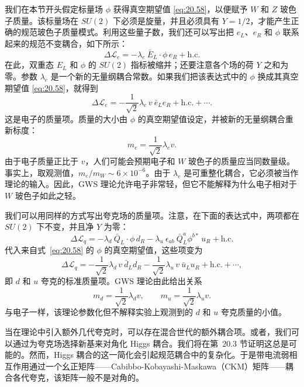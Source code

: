 我们在本节开头假定标量场 $\phi$ 获得真空期望值 \eqref{eq:20.58}，以便赋予 $W$ 和 $Z$ 玻色子质量。该标量场在 $SU(2)$ 下必须是旋量，并且必须具有 $Y = 1/2$，才能产生正确的规范玻色子质量模式。利用这些量子数，我们还可以写出把 $e_L$、$e_R$ 和 $\phi$ 联系起来的规范不变耦合，如下所示：
\begin{equation}
  \Delta\mathcal{L}_e = -\lambda_e\ \bar{E}_L\cdot\phi\,e_R + \mathrm{h.c.}
  \label{eq:20.98}
\end{equation}
在此，双重态 $E_L$ 和 $\phi$ 的 $SU(2)$ 指标被缩并；还要注意各个场的荷 $Y$ 之和为零。参数 $\lambda_e$ 是一个新的无量纲耦合常数。如果我们把该表达式中的 $\phi$ 换成其真空期望值 \eqref{eq:20.58}，就得到
\begin{equation}
  \Delta\mathcal{L}_e = -\frac{1}{\sqrt{2}}\lambda_e\,v\ \bar{e}_Le_R
    + \mathrm{h.c.} + \cdots .
  \label{eq:20.99}
\end{equation}
这是电子的质量项。质量的大小由 $\phi$ 的真空期望值设定，并被新的无量纲耦合重新标度：
\begin{equation}
  m_e = \frac{1}{\sqrt{2}}\lambda_e v .
  \label{eq:20.100}
\end{equation}
由于电子质量正比于 $v$，人们可能会预期电子和 $W$ 玻色子的质量应当同数量级。事实上，取观测值，$m_e/m_W \sim 6\times10^{-6}$。由于 $\lambda_e$ 是可重整化耦合，它必须被当作理论的输入。因此，GWS 理论允许电子非常轻，但它不能解释为什么电子相对于 $W$ 玻色子如此之轻。

我们可以用同样的方式写出夸克场的质量项。注意，在下面的表达式中，两项都在 $SU(2)$ 下不变，并且净 $Y$ 为零：
\begin{equation}
  \Delta\mathcal{L}_q = -\lambda_d\ \bar{Q}_L\cdot\phi\,d_R
    - \lambda_u\ \epsilon_{ab}\ \bar{Q}^a_L\phi^{b*}\,u_R + \mathrm{h.c.}
  \label{eq:20.101}
\end{equation}
代入来自式~\eqref{eq:20.58} 的 $\phi$ 的真空期望值，这些项变为
\begin{equation}
  \Delta\mathcal{L}_q = -\frac{1}{\sqrt{2}}\lambda_d\,v\ \bar{d}_Ld_R
    - \frac{1}{\sqrt{2}}\lambda_u\,v\ \bar{u}_Lu_R + \mathrm{h.c.} + \cdots ,
  \label{eq:20.102}
\end{equation}
即 $d$ 和 $u$ 夸克的标准质量项。GWS 理论由此给出关系
\begin{equation}
  m_d = \frac{1}{\sqrt{2}}\lambda_d v,\qquad
  m_u = \frac{1}{\sqrt{2}}\lambda_u v .
  \label{eq:20.103}
\end{equation}
与电子一样，该理论参数化但不解释实验上观测到的 $d$ 和 $u$ 夸克质量的小值。

当在理论中引入额外几代夸克时，可以存在混合世代的额外耦合项。或者，我们可以通过为夸克场选择新基来对角化 Higgs 耦合。我们将在第~20.3 节证明这总是可能的。然而，Higgs 耦合的这一简化会引起规范耦合中的复杂化。于是带电流弱相互作用通过一个幺正矩阵——Cabibbo-Kobayashi-Maskawa（CKM）矩阵——耦合各代夸克，该矩阵一般不是对角的。

